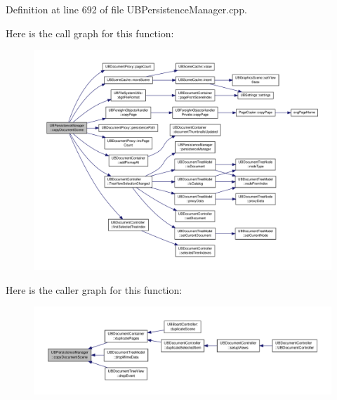 Definition at line 692 of file U\-B\-Persistence\-Manager.\-cpp.



Here is the call graph for this function\-:
\nopagebreak
\begin{figure}[H]
\begin{center}
\leavevmode
\includegraphics[width=350pt]{d0/dd5/class_u_b_persistence_manager_a02050499f8179287038922f42ddf2e17_cgraph}
\end{center}
\end{figure}




Here is the caller graph for this function\-:
\nopagebreak
\begin{figure}[H]
\begin{center}
\leavevmode
\includegraphics[width=350pt]{d0/dd5/class_u_b_persistence_manager_a02050499f8179287038922f42ddf2e17_icgraph}
\end{center}
\end{figure}


